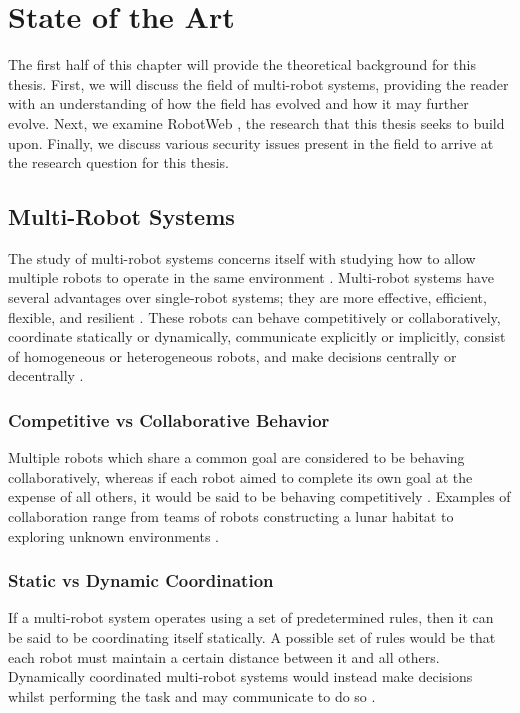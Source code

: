 \chapter{State of the Art}

The first half of this chapter will provide the theoretical background for this thesis. First, we will discuss the field of multi-robot systems, providing the reader with an understanding of how the field has evolved and how it may further evolve. Next, we examine RobotWeb \cite{Robotweb}, the research that this thesis seeks to build upon. Finally, we discuss various security issues present in the field to arrive at the research question for this thesis.

\section{Multi-Robot Systems}
The study of multi-robot systems concerns itself with studying how to allow multiple robots to operate in the same environment \cite{MRS-Implicit-Explicit-Comms}. Multi-robot systems have several advantages over single-robot systems; they are more effective, efficient, flexible, and resilient \cite{MultiVsSingleRobotSystems}. These robots can behave competitively or collaboratively, coordinate statically or dynamically, communicate explicitly or implicitly, consist of homogeneous or heterogeneous robots, and make decisions centrally or decentrally \cite{MultiRobotCoordinationSurvey}.

\subsection{Competitive vs Collaborative Behavior}
Multiple robots which share a common goal are considered to be behaving collaboratively, whereas if each robot aimed to complete its own goal at the expense of all others, it would be said to be behaving competitively \cite{MultiRobotCoordinationSurvey}. Examples of collaboration range from teams of robots constructing a lunar habitat \cite{LunarHabitatConstructionExample} to exploring unknown environments \cite{MultiRobotExplorationExample}.

\subsection{Static vs Dynamic Coordination}
If a multi-robot system operates using a set of predetermined rules, then it can be said to be coordinating itself statically. A possible set of rules would be that each robot must maintain a certain distance between it and all others. Dynamically coordinated multi-robot systems would instead make decisions whilst performing the task and may communicate to do so \cite{MultiRobotCoordinationSurvey}.

